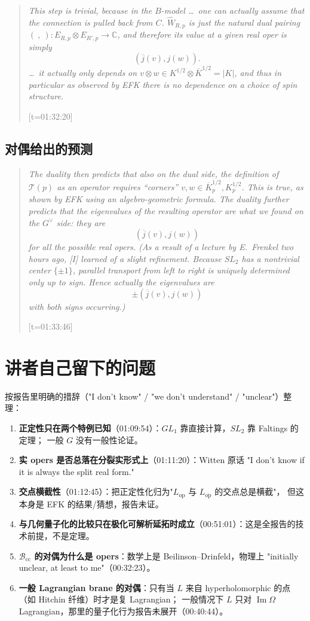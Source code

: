\documentclass[11pt,a4paper]{ctexart}
\newcommand{\slq}[2]{%
  \begin{quote}\small\itshape #2\par
  \raggedleft\normalfont\footnotesize\textcolor{gray}{[t=#1]}\end{quote}}
\newcommand{\Bcc}{\mathcal{B}_{\mathrm{cc}}}
\newcommand{\op}{\mathrm{op}}
\newcommand{\opb}{\overline{\mathrm{op}}}
\begin{document}
\slq{01:32:20}{This step is trivial, because in the $B$-model \dots\ one can actually assume that the
connection is pulled back from $C$. $\widehat{W}_{R,p}$ is just the natural dual pairing
$(\ ,\ ):E_{R,p}\otimes E_{R',p}\to\mathbb{C}$, and therefore its value at a given real oper is simply
\[
(\overline{j}(v),j(w)).
\]
\dots\ it actually only depends on $v\otimes w\in K^{1/2}\otimes\overline{K}^{1/2}=|K|$, and thus in
particular as observed by EFK there is no dependence on a choice of spin structure.}

\subsection{对偶给出的预测}

\slq{01:33:46}{The duality then predicts that also on the dual side, the definition of $\mathcal{T}(p)$
as an operator requires ``corners'' $v,w\in\overline{K}_p^{1/2},K_p^{1/2}$. This is true, as shown by
EFK using an algebro-geometric formula. The duality further predicts that the eigenvalues of the
resulting operator are what we found on the $G^{\vee}$ side: they are
\[
(\overline{j}(v),j(w))
\]
for all the possible real opers. (As a result of a lecture by E.~Frenkel two hours ago, [I] learned of a
slight refinement. Because $SL_2$ has a nontrivial center $\{\pm1\}$, parallel transport from left to
right is uniquely determined only up to sign. Hence actually the eigenvalues are
\[
\pm(\overline{j}(v),j(w))
\]
with both signs occurring.)}


\section{讲者自己留下的问题}

按报告里明确的措辞（"I don't know" / "we don't understand" / "unclear"）整理：

\begin{enumerate}[label=\arabic*.]
\item \textbf{正定性只在两个特例已知}（01:09:54）：$GL_1$ 靠直接计算，$SL_2$ 靠 Faltings 的定理；
一般 $G$ 没有一般性论证。
\item \textbf{实 opers 是否总落在分裂实形式上}（01:11:20）：Witten 原话 "I don't know if it is always
the split real form."
\item \textbf{交点横截性}（01:12:45）：把正定性化归为"$L_{\op}$ 与 $L_{\opb}$ 的交点总是横截"，
但这本身是 EFK 的结果/猜想，报告未证。
\item \textbf{与几何量子化的比较只在极化可解析延拓时成立}（00:51:01）：这是全报告的技术前提，不是定理。
\item \textbf{$\Bcc$ 的对偶为什么是 opers}：数学上是 Beilinson–Drinfeld，物理上 "initially unclear, at least to me"（00:32:23）。
\item \textbf{一般 Lagrangian brane 的对偶}：只有当 $L$ 来自 hyperholomorphic 的点（如 Hitchin 纤维）时才是复 Lagrangian；
一般情况下 $L$ 只对 $\operatorname{Im}\Omega$ Lagrangian，那里的量子化行为报告未展开（00:40:44）。
\end{enumerate}
\end{document}
